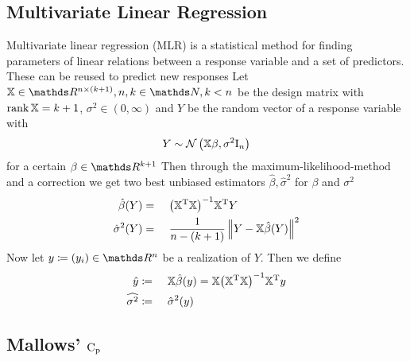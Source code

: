 	

	\subsection{Multivariate Linear Regression}
	\label{ssec:mlr}
	
		Multivariate linear regression (MLR) is a statistical method for finding parameters of linear relations between a response variable and a set of predictors.
		These can be reused to predict new responses \cite{draper:98a, pardoe:12a, schumacher:16a}
		Let $\mathbb{X}\in\SR^{n\times(k+1)}, n,k\in\SN,k<n$ be the design matrix with $\operatorname{rank}{\mathbb{X}} = k+1$, $\sigma^2\in(0,\infty)$ and $Y$ be the random vector of a response variable with
		\[
			Y \sim \mathcal{N}\left( \mathbb{X}\beta,\sigma^2\mathrm{I}_n \right)
		\]
		for a certain $\beta\in\SR^{k+1}$
		Then through the maximum-likelihood-method and a correction we get two best unbiased estimators $\hat{\beta},\hat{\sigma}^2$ for $\beta$ and $\sigma^2$
		\begin{alignat*}{3}
			\hat{\beta}(Y) &=&&\ \inv{\curvb{\transp{\mathbb{X}}\mathbb{X}}}\transp{\mathbb{X}}Y \\
			\hat{\sigma}^2(Y) &=&&\ \frac{1}{n-(k+1)}\norm{Y - \mathbb{X}\hat{\beta}(Y)}^2
		\end{alignat*}
		Now let $y \define (y_i)\in\SR^n$ be a realization of $Y$.
		Then we define
		\begin{alignat*}{3}
			\hat{y} &\define&&\ \mathbb{X}\hat{\beta}(y) = \mathbb{X}\inv{\curvb{\transp{\mathbb{X}}\mathbb{X}}}\transp{\mathbb{X}}y \\
			\widehat{{\sigma}^2} &\define&&\ \hat{\sigma}^2(y)
		\end{alignat*}


	\subsection{Mallows' $\mathrm{C_p}$}
	\label{ssec:mallows-C_p}
	
